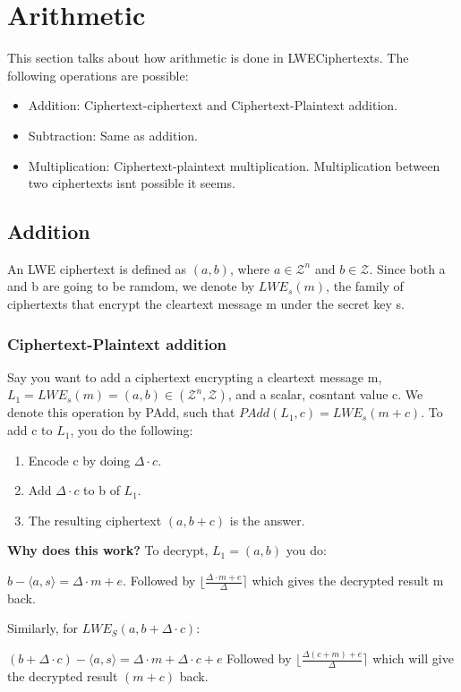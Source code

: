 \documentclass{report}
\begin{document}
\section{Arithmetic}
This section talks about how arithmetic is done in LWECiphertexts. The following operations are possible:
\begin{itemize}
  \item Addition: Ciphertext-ciphertext and Ciphertext-Plaintext addition.
  \item Subtraction: Same as addition.
        \item Multiplication: Ciphertext-plaintext multiplication. Multiplication between two ciphertexts isnt possible it seems.
\end{itemize}

\subsection{Addition}
An LWE ciphertext is defined as $(a, b)$, where $a \in \mathcal{Z}^n$ and $b \in \mathcal{Z}$. Since both a and b are going to be ramdom, we denote by $LWE_s(m)$, the family of ciphertexts that encrypt the cleartext message m under the secret key s.
\subsubsection{Ciphertext-Plaintext addition}
Say you want to add a ciphertext encrypting a cleartext message m, $L_1 = LWE_s(m) = (a, b) \in (\mathcal{Z}^n, \mathcal{Z})$, and a scalar, cosntant value c. We denote this operation by PAdd, such that $PAdd(L_1, c) = LWE_s(m+c)$. To add c to $L_1$, you do the following:
\begin{enumerate}
  \item Encode c by doing $\Delta \cdot c$.
  \item Add $\Delta \cdot c$ to b of $L_1$.
        \item The resulting ciphertext $(a, b + c)$ is the answer.
\end{enumerate}

\textbf{Why does this work?} \newline
To decrypt, $L_1 = (a, b)$ you do:
\begin{center}
  $b - \langle a, s \rangle = \Delta \cdot m + e$.\newline
  Followed by $\lfloor \frac{\Delta \cdot m + e}{\Delta} \rceil$ which gives the decrypted result m back.
\end{center}
Similarly, for $LWE_S(a, b+\Delta \cdot c)$:
\begin{center}
  $(b + \Delta \cdot c) - \langle a, s \rangle = \Delta \cdot m + \Delta \cdot c + e$ \newline
  Followed by $\lfloor \frac{\Delta (c + m) + e} {\Delta} \rceil$ which will give the decrypted result $(m + c)$ back.
\end{center}
\end{document}

